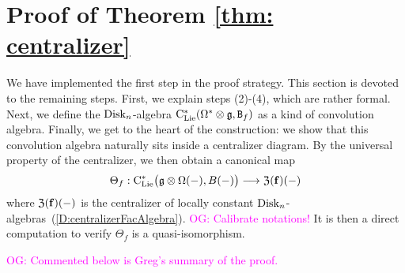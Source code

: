 \documentclass[11pt]{amsart}
\numberwithin{equation}{section}
\def\owen{\textcolor{magenta}{OG: }\textcolor{magenta}}
\def\greg{\textcolor{red}{GG: }\textcolor{red}}
\begin{document}
\section{Proof of Theorem \ref{thm: centralizer}}

We have implemented the first step in the proof strategy.
This section is devoted to the remaining steps.
First, we explain steps (2)-(4), which are rather formal.
Next, we define the ${\rm Disk}_n$-algebra ${\rm C}_{\rm Lie}^*(\Omega^* \otimes \mathfrak g, {\tt B}_f)$ as a kind of convolution algebra.
Finally, we get to the heart of the construction:
we show that this convolution algebra naturally sits inside a centralizer diagram.
By the universal property of the centralizer, we then obtain 
a canonical map 
\[
\Theta_f: {\rm C}_{\rm Lie}^*\big(\mathfrak g\otimes \Omega (-), B(-) \big) \longrightarrow  {\frak Z}(\mathbf{f})(-)
\]
where ${\frak Z}(\mathbf{f})(-)$ is the centralizer of locally constant ${\rm Disk}_n$-algebras~(\ref{D:centralizerFacAlgebra}).
\owen{Calibrate notations!}
It is then a direct computation to verify $\Theta_f$ is a quasi-isomorphism.

\owen{Commented below is Greg's summary of the proof.}

%
%
%
%
\end{document}
